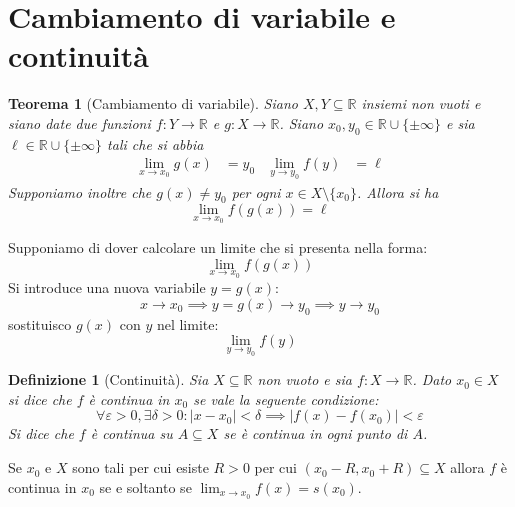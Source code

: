 \documentclass[11pt]{book}
\newtheorem{theorem}{Teorema}[chapter]
\newtheorem{definition}{Definizione}[chapter]
\begin{document}
\section{Cambiamento di variabile e continuità}
\begin{theorem}[Cambiamento di variabile]
    Siano $X,Y\subseteq\mathbb{R}$ insiemi non vuoti e siano date due funzioni $f:Y\rightarrow\mathbb{R}$ e $g:X\rightarrow\mathbb{R}$.
    Siano $x_0,y_0\in\mathbb{R}\cup\{\pm\infty\}$ e sia $\ell\in\mathbb{R}\cup\{\pm\infty\}$ tali che si abbia 
    \begin{align*}
        \lim_{x\rightarrow x_0}g(x)&=y_0 & \lim_{y\rightarrow y_0}f(y)&=\ell
    \end{align*}
    Supponiamo inoltre che $g(x)\neq y_0$ per ogni $x\in X\setminus\{x_0\}$. Allora si ha 
    \begin{equation*}
        \lim_{x\rightarrow x_0}f(g(x))=\ell
    \end{equation*}
\end{theorem}
Supponiamo di dover calcolare un limite che si presenta nella forma:
\begin{equation*}
    \lim_{x\rightarrow x_0}f(g(x))
\end{equation*}
Si introduce una nuova variabile $y=g(x)$:
\begin{equation*}
    x\rightarrow x_0 \implies y=g(x)\rightarrow y_0 \implies y\rightarrow y_0
\end{equation*}
sostituisco $g(x)$ con $y$ nel limite:
\begin{equation*}
    \lim_{y\rightarrow y_0}f(y)
\end{equation*}
\begin{definition}[Continuità]
    Sia $X\subseteq\mathbb{R}$ non vuoto e sia $f:X\rightarrow\mathbb{R}$. Dato $x_0\in X$ si dice che $f$ è continua in 
    $x_0$ se vale la seguente condizione:
    \begin{equation*}
        \forall\varepsilon>0,\exists\delta>0:|x-x_0|<\delta\implies|f(x)-f(x_0)|<\varepsilon
    \end{equation*}
    Si dice che $f$ è continua su $A\subseteq X$ se è continua in ogni punto di $A$.
\end{definition}
Se $x_0$ e $X$ sono tali per cui esiste $R>0$ per cui $(x_0-R,x_0+R)\subseteq X$ allora $f$ è continua in $x_0$ se e soltanto
se $\lim_{x\rightarrow x_0}f(x)=s(x_0)$.
\end{document}
